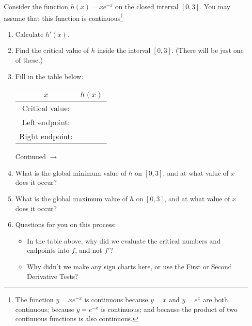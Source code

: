 \documentclass[11pt]{article}
\def\ra{\rightarrow}
\def\pageturn{\vfill 
\begin{flushright}
	\begin{small}
		Continued $\ra$
	\end{small}
\end{flushright} \newpage}
\begin{document}
Consider the function $h(x) = xe^{-x}$ on the closed interval $[0,3]$. You may assume that this function is continuous\footnote{The function $y = xe^{-x}$ is continuous because $y = x$ and $y = e^x$ are both continuous; because $y = e^{-x}$ is continuous; and because the product of two continuous functions is also continuous.}

\begin{enumerate}
	\item Calculate $h'(x)$. 
	
	\vspace{0.7in}
	
	\item Find the critical value of $h$ inside the interval $[0,3]$. (There will be just one of these.) 
	
	\vspace{0.7in}
	
	
	\item Fill in the table below: 
	\begin{center}
		\begin{tabular}{c||c}
		$x$ & $h(x)$ \\ \hline
		Critical value: \hspace{0.3in} & \hspace{0.5in} \\ \hline
		Left endpoint: \hspace{0.3in} & \hspace{0.5in} \\ \hline
		Right endpoint: \hspace{0.3in} & \hspace{0.5in} 
		\end{tabular}
	\end{center}
	
	\pageturn
	
	\item What is the global minimum value of $h$ on $[0,3]$, and at what value of $x$ does it occur? 
	
	
	\vspace{0.4in}
	
	\item What is the global maximum value of $h$ on $[0,3]$, and at what value of $x$ does it occur? 
	
	
	\vspace{0.4in}
	
	\item Questions for you on this process:
	\begin{itemize}
		\item In the table above, why did we evaluate the critical numbers and endpoints into $f$, and not $f'$? 
		\item Why didn't we make any sign charts here, or use the First or Second Derivative Tests? 
	\end{itemize}
	
\end{enumerate}
\end{document}
